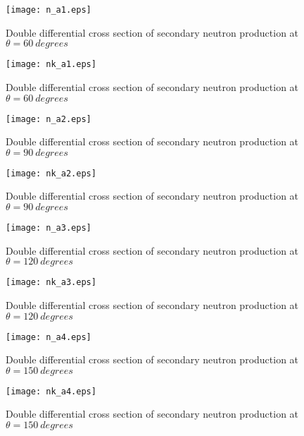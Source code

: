 \documentclass[12pt]{article}
\begin{document}
\begin{figure}[htbp]
\caption{Double differential cross section of secondary neutron production at $\theta = 60~degrees$}
\label{figa1} 
\centerline{\texttt{[image: n\_a1.eps]}}
\end{figure}

\begin{figure}[htbp]
\caption{Double differential cross section of secondary neutron production at $\theta = 60~degrees$}
\label{figa1a} 
\centerline{\texttt{[image: nk\_a1.eps]}}
\end{figure}

\begin{figure}[htbp]
\caption{Double differential cross section of secondary neutron production at $\theta = 90~degrees$}
\label{figa2} 
\centerline{\texttt{[image: n\_a2.eps]}}
\end{figure}

\begin{figure}[htbp]
\caption{Double differential cross section of secondary neutron production at $\theta = 90~degrees$}
\label{figa2a} 
\centerline{\texttt{[image: nk\_a2.eps]}}
\end{figure}

\clearpage

\begin{figure}[htbp]
\caption{Double differential cross section of secondary neutron production at $\theta = 120~degrees$}
\label{figa3} 
\centerline{\texttt{[image: n\_a3.eps]}}
\end{figure}

\begin{figure}[htbp]
\caption{Double differential cross section of secondary neutron production at $\theta = 120~degrees$}
\label{figa3a} 
\centerline{\texttt{[image: nk\_a3.eps]}}
\end{figure}

\begin{figure}[htbp]
\caption{Double differential cross section of secondary neutron production at $\theta = 150~degrees$}
\label{figa4} 
\centerline{\texttt{[image: n\_a4.eps]}}
\end{figure}

\begin{figure}[htbp]
\caption{Double differential cross section of secondary neutron production at $\theta = 150~degrees$}
\label{figa4a} 
\centerline{\texttt{[image: nk\_a4.eps]}}
\end{figure}
\end{document}

